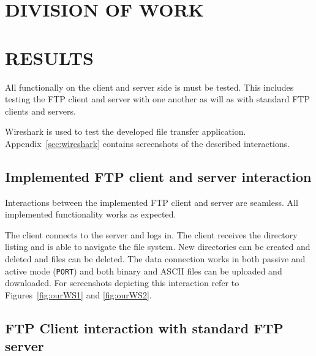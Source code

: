 \documentclass[10pt,twocolumn]{witseiepaper}
\begin{document}
\section{DIVISION OF WORK}

\section{RESULTS}\label{results}

All functionally on the client and server side is must be tested. This includes testing the FTP client and server with one another as will as with standard FTP clients and servers.


Wireshark is used to test the developed file transfer application. Appendix~\ref{sec:wireshark} contains screenshots of the described interactions. 

\subsection{Implemented FTP client and server interaction}

Interactions between the implemented FTP client and server are seamless. All implemented functionality works as expected.

The client connects to the server and logs in. The client receives the directory listing and is able to navigate the file system. New directories can be created and deleted and files can be deleted. The data connection works in both passive and active mode (\texttt{PORT}) and both binary and ASCII files can be uploaded and downloaded. For screenshots depicting this interaction refer to Figures~\ref{fig:ourWS1} and \ref{fig:ourWS2}.
 

\subsection{FTP Client interaction with standard FTP server}
\end{document}

